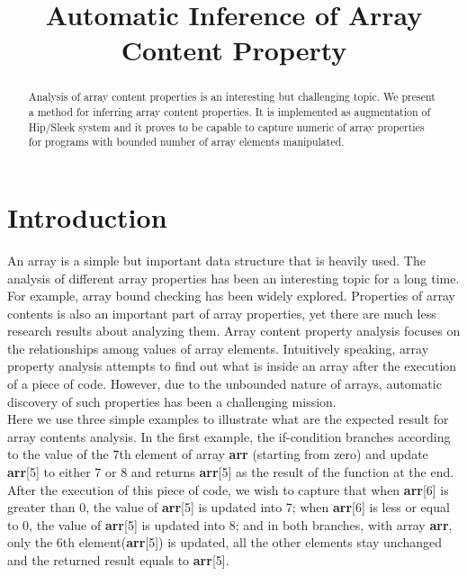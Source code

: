 \documentclass[]{article}
\title{Automatic Inference of Array Content Property}
\author{}
\begin{document}
\lstset{language=C}
\lstset{showstringspaces=false}
\maketitle

\begin{abstract}
Analysis of array content properties is an interesting but challenging topic. We present a method for inferring array content properties. It is implemented as augmentation of Hip/Sleek system and it proves to be capable to capture numeric of array properties for programs with bounded number of array elements manipulated.

\end{abstract}
\section{Introduction}
An array is a simple but important data structure that is heavily used. The analysis of different array properties has been an interesting topic for a long time. For example, array bound checking has been widely explored. Properties of array contents is also an important part of array properties, yet there are much less research results about analyzing them. Array content property analysis focuses on the relationships among values of array elements. Intuitively speaking, array property analysis attempts to find out what is inside an array after the execution of a piece of code. However, due to the unbounded nature of arrays, automatic discovery of such properties has been a challenging mission.\\

Here we use three simple examples to illustrate what are the expected result for array contents analysis. In the first example, the if-condition branches according to the value of the 7th element of array \textbf{arr} (starting from zero) and update \textbf{arr}[5] to either 7 or 8 and returns \textbf{arr}[5] as the result of the function at the end. After the execution of this piece of code, we wish to capture that when \textbf{arr}[6] is greater than 0, the value of \textbf{arr}[5] is updated into 7; when \textbf{arr}[6] is less or equal to 0, the value of \textbf{arr}[5] is updated into 8; and in both branches, with array \textbf{arr}, only the 6th element(\textbf{arr}[5]) is updated, all the other elements stay unchanged and the returned result equals to \textbf{arr}[5].\\
\end{document}
